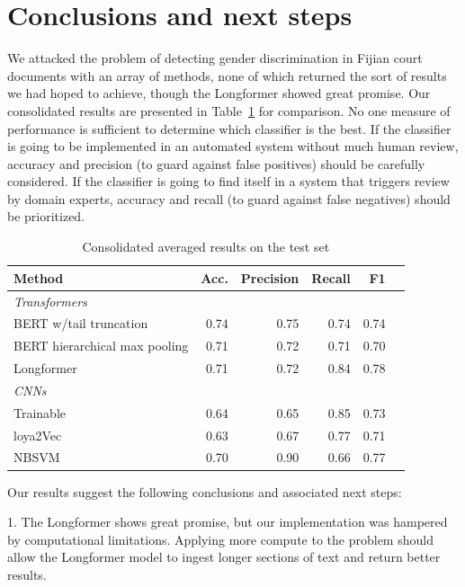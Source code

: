 \documentclass[twocolumn,10pt]{wmrDoc}
\begin{document}
\section{Conclusions and next steps}

We attacked the problem of detecting gender discrimination in Fijian court documents with an array of methods, none of which returned the sort of results we had hoped to achieve, though the Longformer showed great promise.  Our consolidated results are presented in Table~\ref{tab:conclusion} for comparison.  No one measure of performance is sufficient to determine which classifier is the best.  If the classifier is going to be implemented in an automated system without much human review, accuracy and precision (to guard against false positives) should be carefully considered.  If the classifier is going to find itself in a system that triggers review by domain experts, accuracy and recall (to guard against false negatives) should be prioritized.

\begin{table}
 \caption{Consolidated averaged results on the test set}
  \centering
  \begin{tabular}{lrrrrr}
    \toprule
    Method & Acc. & Precision & Recall & F1\\
    \midrule
    \em Transformers \\
    BERT w/tail truncation         & 0.74 & 0.75 & 0.74 & 0.74 \\
    BERT hierarchical max pooling  & 0.71 & 0.72 & 0.71 & 0.70 \\
    Longformer                     & 0.71 & 0.72 & 0.84 & 0.78 \\
    \midrule
    \em CNNs\\
    Trainable                      & 0.64 & 0.65 & 0.85 & 0.73 \\
    loya2Vec                       & 0.63 & 0.67 & 0.77 & 0.71 \\
    \midrule
    NBSVM                          & 0.70 & 0.90 & 0.66 & 0.77 \\
    \bottomrule
  \end{tabular}
  \label{tab:conclusion}
\end{table}

Our results suggest the following conclusions and associated next steps:

1. The Longformer shows great promise, but our implementation was hampered by computational limitations.  Applying more compute to the problem should allow the Longformer model to ingest longer sections of text and return better results.
\end{document}
